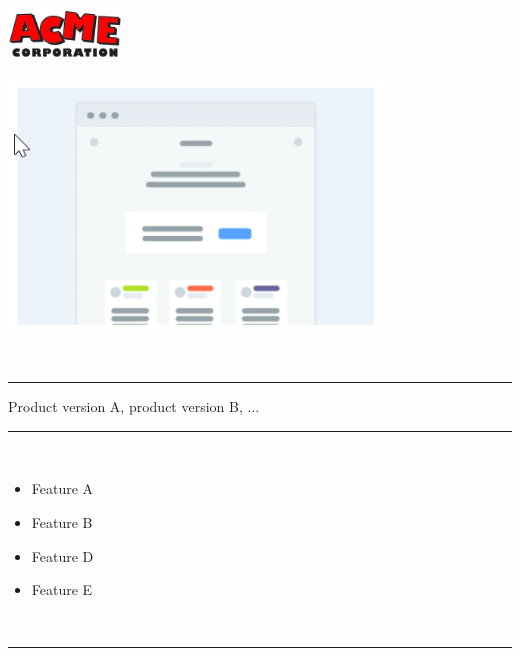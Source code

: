\documentclass[oneside]{book}
\begin{document}
	\begin{titlepage}
		\begin{flushright}
			\includegraphics[width=3cm]{Acme-corp.png}
		\end{flushright}
		\vfil
		\begin{center}
			\includegraphics[width=10cm]{wireframe.png}
		\end{center}
		\vfil
		\Huge
		\productname \\
		\rule{\textwidth}{1pt}
		\Large
		Product version A, product version B, $\ldots$\\
		\rule{\textwidth}{1pt}\\[0.5em]
		\begin{minipage}{0.5\textwidth}
			\begin{itemize}
				\item Feature A
				\item Feature B
			\end{itemize}
		\end{minipage}
		\hfill
		\begin{minipage}{0.5\textwidth}
			\begin{flushright}
				\begin{itemize}
					\item Feature D
					\item Feature E
				\end{itemize}
			\end{flushright}
		\end{minipage}
		\\[0.5em]
		\rule{\textwidth}{1pt}\\[0.5em]
		\begin{minipage}{0.5\textwidth}
			\begin{flushleft}
				\documentid\\
				\publicationdate
			\end{flushleft}
		\end{minipage}
		\hfill
		\begin{minipage}{0.5\textwidth}
			\begin{flushright}
				\manufacturer\\ 
				\publicationtype
			\end{flushright}		
		\end{minipage}
	\end{titlepage}
\end{document}
